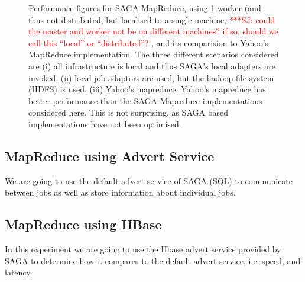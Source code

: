 \documentclass{rspublic}
\newcommand{\jhanote}[1]{ {\textcolor{red} { ***SJ: #1 }}}
\newcommand{\jhanote}[1]{}
\begin{document}
\begin{figure}[t]
      \centering
          \caption{Performance figures for SAGA-MapReduce, using 1
            worker (and thus not distributed, but localised to a
            single machine, \jhanote{could the master and worker not
              be on different machines? if so, should we call this
              ``local'' or ``distributed''?}, and its comparision to
            Yahoo's MapReduce implementation. The three different
            scenarios considered are (i) all infrastructure is local
            and thus SAGA's local adapters are invoked, (ii) local job
            adaptors are used, but the hadoop file-system (HDFS) is
            used, (iii) Yahoo's mapreduce. Yahoo's mapreduce has
            better performance than the SAGA-Mapreduce implementations
            considered here. This is not surprising, as SAGA based
            implementations have not been optimised.}
      \label{saga_mapreduce_1worker.png}
\end{figure}


\begin{figure}[t]
      \centering
          \caption{}
      \label{saga_mapreduce_3workers.png}
\end{figure}


\begin{figure}[t]
      \centering
          \caption{}
      \label{sagaallpairs}
\end{figure}


\begin{figure}[t]
      \centering
          \caption{}
      \label{saga_allpairs_1and3workers.png}
\end{figure}


\subsection*{MapReduce using Advert Service}
We are going to use the default advert service of SAGA (SQL) to 
communicate between jobs as well as store information about 
individual jobs.

\subsection*{MapReduce using HBase}
In this experiment we are going to use the Hbase advert service 
provided by SAGA to determine how it compares to the default advert 
service, i.e. speed, and latency.
\end{document}
